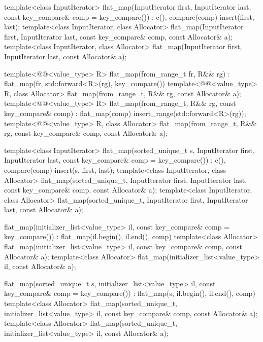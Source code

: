 \begin{codeblock}
{{    template<class InputIterator>
      flat_map(InputIterator first, InputIterator last, const key_compare& comp = key_compare())
        : c(), compare(comp) { insert(first, last); }
    template<class InputIterator, class Allocator>
      flat_map(InputIterator first, InputIterator last,
               const key_compare& comp, const Allocator& a);
    template<class InputIterator, class Allocator>
      flat_map(InputIterator first, InputIterator last, const Allocator& a);

    template<@@<value_type> R>
      flat_map(from_range_t fr, R&& rg)
        : flat_map(fr, std::forward<R>(rg), key_compare()) { }
    template<@@<value_type> R, class Allocator>
      flat_map(from_range_t, R&& rg, const Allocator& a);
    template<@@<value_type> R>
      flat_map(from_range_t, R&& rg, const key_compare& comp)
        : flat_map(comp) { insert_range(std::forward<R>(rg)); }
    template<@@<value_type> R, class Allocator>
      flat_map(from_range_t, R&& rg, const key_compare& comp, const Allocator& a);

    template<class InputIterator>
      flat_map(sorted_unique_t s, InputIterator first, InputIterator last,
               const key_compare& comp = key_compare())
        : c(), compare(comp) { insert(s, first, last); }
    template<class InputIterator, class Allocator>
      flat_map(sorted_unique_t, InputIterator first, InputIterator last,
               const key_compare& comp, const Allocator& a);
    template<class InputIterator, class Allocator>
      flat_map(sorted_unique_t, InputIterator first, InputIterator last, const Allocator& a);

    flat_map(initializer_list<value_type> il, const key_compare& comp = key_compare())
        : flat_map(il.begin(), il.end(), comp) { }
    template<class Allocator>
      flat_map(initializer_list<value_type> il, const key_compare& comp, const Allocator& a);
    template<class Allocator>
      flat_map(initializer_list<value_type> il, const Allocator& a);

    flat_map(sorted_unique_t s, initializer_list<value_type> il,
             const key_compare& comp = key_compare())
        : flat_map(s, il.begin(), il.end(), comp) { }
    template<class Allocator>
      flat_map(sorted_unique_t, initializer_list<value_type> il,
               const key_compare& comp, const Allocator& a);
    template<class Allocator>
      flat_map(sorted_unique_t, initializer_list<value_type> il, const Allocator& a);

}}
\end{codeblock}
